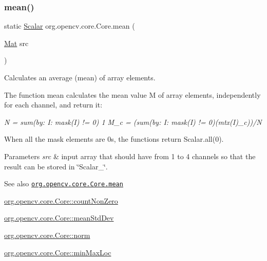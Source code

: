 \subsubsection{\texorpdfstring{mean()}{mean()}\hspace{0.1cm}{\footnotesize\ttfamily [2/2]}}
{\footnotesize\ttfamily static \mbox{\hyperlink{classorg_1_1opencv_1_1core_1_1_scalar}{Scalar}} org.\+opencv.\+core.\+Core.\+mean (\begin{DoxyParamCaption}\item[{\mbox{\hyperlink{classorg_1_1opencv_1_1core_1_1_mat}{Mat}}}]{src }\end{DoxyParamCaption})\hspace{0.3cm}{\ttfamily [static]}}

Calculates an average (mean) of array elements.

The function {\ttfamily mean} calculates the mean value {\ttfamily M} of array elements, independently for each channel, and return it\+:

{\itshape N = sum(by\+: I\+: mask(\+I) != 0) 1 M\+\_\+c = (sum(by\+: I\+: mask(\+I) != 0)(mtx(\+I)\+\_\+c))/N }

When all the mask elements are 0\textquotesingle{}s, the functions return {\ttfamily Scalar.\+all(0)}.


\begin{DoxyParams}{Parameters}
{\em src} & input array that should have from 1 to 4 channels so that the result can be stored in \char`\"{}\+Scalar\+\_\+\char`\"{}.\\
\hline
\end{DoxyParams}
\begin{DoxySeeAlso}{See also}
\href{http://docs.opencv.org/modules/core/doc/operations_on_arrays.html#mean}{\tt org.\+opencv.\+core.\+Core.\+mean} 

\mbox{\hyperlink{classorg_1_1opencv_1_1core_1_1_core_a216308f36e765f82c521087fe283e045}{org.\+opencv.\+core.\+Core\+::count\+Non\+Zero}} 

\mbox{\hyperlink{classorg_1_1opencv_1_1core_1_1_core_af8d7fbb33c11fbf6115d4c242dbbb5b3}{org.\+opencv.\+core.\+Core\+::mean\+Std\+Dev}} 

\mbox{\hyperlink{classorg_1_1opencv_1_1core_1_1_core_a282aac8c7806f10f75738bf8db3af7a8}{org.\+opencv.\+core.\+Core\+::norm}} 

\mbox{\hyperlink{classorg_1_1opencv_1_1core_1_1_core_a87987114238d2094a01395f12d6a9367}{org.\+opencv.\+core.\+Core\+::min\+Max\+Loc}} 
\end{DoxySeeAlso}
\mbox{\label{classorg_1_1opencv_1_1core_1_1_core_af8d7fbb33c11fbf6115d4c242dbbb5b3}} 
